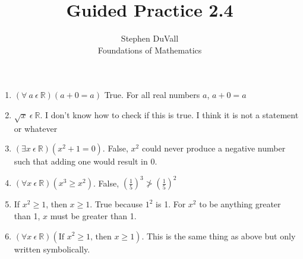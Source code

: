 \documentclass[12pt]{article}
\newenvironment{bgact}[2][Beginning Activity]{\begin{trivlist}
\item[\hskip \labelsep {\bfseries #1}\hskip \labelsep {\bfseries #2.}]}{\end{trivlist}}
\begin{document}

\title{Guided Practice 2.4}%
\author{Stephen DuVall \\ %
Foundations of Mathematics} %

\maketitle

\begin{bgact}{2.4}
\hfill
\begin{enumerate}
\item $(\forall \ a \ \epsilon \ \mathbb{R}) (a + 0 = a)$ True. For all real numbers $a$, $a + 0 = a$
\item[3.] $\sqrt{x}\  \epsilon\ \mathbb{R}$. I don't know how to check if this is true. I think it is not a statement or whatever
\item[6.] $(\exists x\ \epsilon\ \mathbb{R}) (x^2+1=0)$. False, $x^2$ could never produce a negative number such that adding one would result in $0$.
\item[7.] $(\forall x\ \epsilon\ \mathbb{R})(x^3 \geq x^2)$. False, $(\frac{1}{5})^3 \ngtr (\frac{1}{5})^2$
\item[9.] If $x^2 \geq 1$, then $x \geq 1$. True because $1^2$ is 1. For $x^2$ to be anything greater than 1, $x$ must be greater than 1.
\item[10.] $(\forall x\ \epsilon\ \mathbb{R})(\text{If } x^2 \geq 1 \text{, then } x \geq 1)$. This is the same thing as above but only written symbolically. 
\end{enumerate}
\end{bgact}
\end{document}

